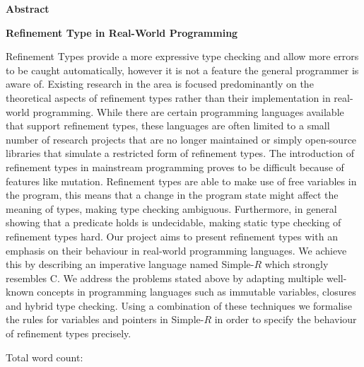 \newpage
{\Huge \bf Abstract}
\vspace{24pt} 

\textbf{Refinement Type in Real-World Programming}

Refinement Types provide a more expressive type checking and allow more errors to be caught automatically, however it is not a feature the general programmer is aware of. Existing research in the area is focused predominantly on the theoretical aspects of refinement types rather than their implementation in real-world programming. While there are certain programming languages available that support refinement types, these languages are often limited to a small number of research projects that are no longer maintained or simply open-source libraries that simulate a restricted form of refinement types. The introduction of refinement types in mainstream programming proves to be difficult because of features like mutation. Refinement types are able to make use of free variables in the program, this means that a change in the program state might affect the meaning of types, making type checking ambiguous. Furthermore, in general showing that a predicate holds is undecidable, making static type checking of refinement types hard. Our project aims to present refinement types with an emphasis on their behaviour in real-world programming languages. We achieve this by describing an imperative language named Simple-$R$ which strongly resembles C. We address the problems stated above by adapting multiple well-known concepts in programming languages such as immutable variables, closures and hybrid type checking. Using a combination of these techniques we formalise the rules for variables and pointers in Simple-$R$ in order to specify the behaviour of refinement types precisely. 

\newpage
\vspace{24pt}
Total word count: \wordcount
\vspace*{\fill}

